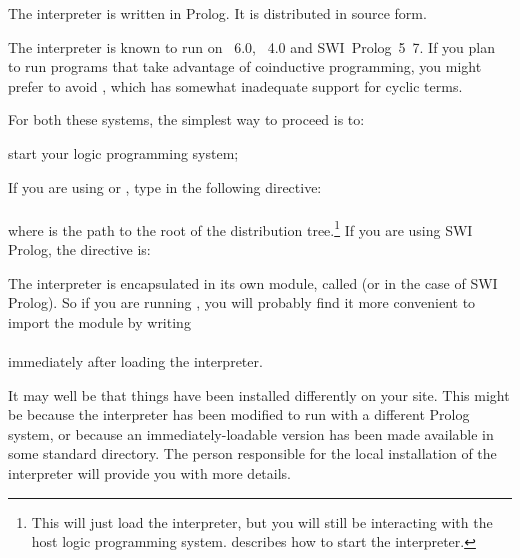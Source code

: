 

%

The interpreter is written in Prolog.  It is distributed in source
form.%

The interpreter is known to run on \Eclipse{}~6.0, \Sicstus{}~4.0 and
SWI~Prolog~5~7.  If you plan to run programs that take advantage of
coinductive programming, you might prefer to avoid \Eclipse{}, which has
somewhat inadequate support for cyclic terms.

For both these systems, the simplest way to proceed is to:
\begin{Enumerate}
\item
  start your logic programming system;
\item
  If you are using \Eclipse{} or \Sicstus{}, type in the following directive:\\
  \ind{}\\
  where  is the path to the root of the distribution
  tree.\footnote{
    This will just load the interpreter, but you will still be interacting
    with the host logic programming system.  
    describes how to start the interpreter.}
  If you are using SWI Prolog, the directive is:\\
  \ind{}
\end{Enumerate}

The interpreter is encapsulated in its own module, called  (or
 in the case of SWI Prolog).  So if
you are running \Eclipse{}, you will probably find it more convenient to import
the module by writing\\
\ind{}\label{import-dra}\\
immediately after loading the interpreter.

It may well be that things have been installed differently on your site.
This might be because the interpreter has been modified to run with a
different Prolog system, or because an immediately-loadable version has been
made available in some standard directory. The person responsible for the
local installation of the interpreter will provide you with more details.


